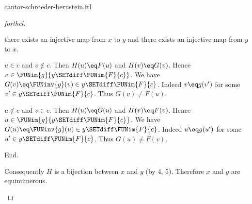 \documentclass{naproche-library}
\begin{document}
\begin{smodule}[title=The Cantor-Schröder-Bernstein Theorem]{cantor-schroeder-bernstein.ftl}
\begin{proof}[forthel]
\begin{case}{there exists an injective map from $x$ to $y$ and there exists an injective map from $y$ to $x$.}
      \begin{case}{$u \in c$ and $v \notin c$.}
        Then $H(u) \eq F(u)$ and $H(v) \eq G(v)$.
        Hence $v \in \FUNim{g}{y \SETdiff \FUNim{F}{c}}$.
        We have $G(v) \eq \FUNinv{g}(v) \in y \SETdiff \FUNim{F}{c}$.
        Indeed $v \eq g(v')$ for some $v' \in y \SETdiff \FUNim{F}{c}$.
        Thus $G(v) \neq F(u)$.
      \end{case}

      \begin{case}{$u \notin c$ and $v \in c$.}
        Then $H(u) \eq G(u)$ and $H(v) \eq F(v)$.
        Hence $u \in \FUNim{g}{y \SETdiff \FUNim{F}{c}}$.
        We have $G(u) \eq \FUNinv{g}(u) \in y \SETdiff \FUNim{F}{c}$.
        Indeed $u \eq g(u')$ for some $u' \in y \SETdiff \FUNim{F}{c}$.
        Thus $G(u) \neq F(v)$.
      \end{case}
    End.

    Consequently $H$ is a bijection between $x$ and $y$ (by 4, 5).
    Therefore $x$ and $y$ are equinumerous.
    \end{case}
\end{proof}
\end{smodule}
\end{document}
